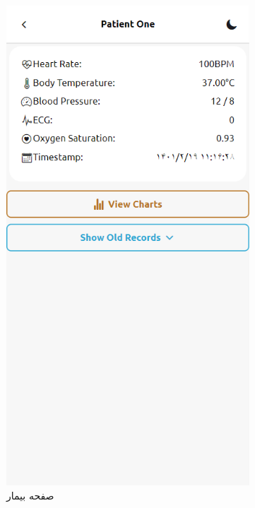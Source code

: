 \documentclass[12pt]{article}
\begin{document}
\begin{figure} %
	\begin{center}
		\begin{subfigure}{.3\textwidth}
			\includegraphics[width=.9\linewidth]{app1_patient}
			\caption{صفحه بیمار}
			\label{patients_screen}
		\end{subfigure}
		\begin{subfigure}{.3\textwidth}

\end{subfigure}
\end{center}
\end{figure}
\end{document}
